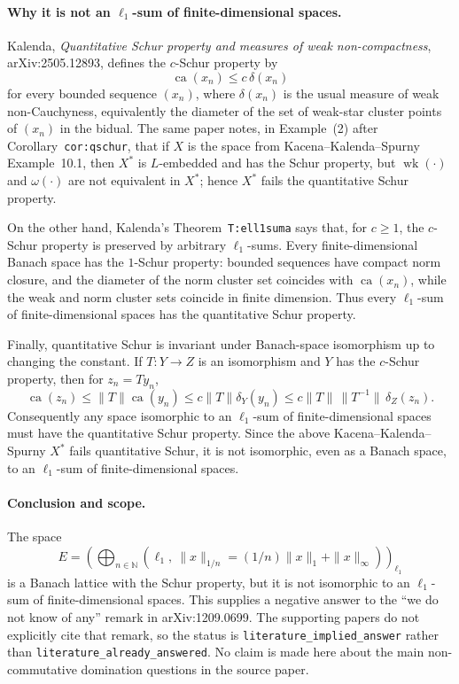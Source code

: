 \documentclass[11pt]{article}
\newcommand{\ca}{\operatorname{ca}}
\begin{document}
\paragraph{Why it is not an \(\ell_1\)-sum of finite-dimensional spaces.}
Kalenda, \emph{Quantitative Schur property and measures of weak
non-compactness}, arXiv:2505.12893, defines the \(c\)-Schur property by
\[
  \ca(x_n)\le c\,\delta(x_n)
\]
for every bounded sequence \((x_n)\), where \(\delta(x_n)\) is the usual
measure of weak non-Cauchyness, equivalently the diameter of the set of
weak-star cluster points of \((x_n)\) in the bidual.  The same paper notes, in
Example~(2) after Corollary~\texttt{cor:qschur}, that if \(X\) is the space
from Kacena--Kalenda--Spurny Example~10.1, then \(X^*\) is \(L\)-embedded and
has the Schur property, but \(\operatorname{wk}(\cdot)\) and
\(\omega(\cdot)\) are not equivalent in \(X^*\); hence \(X^*\) fails the
quantitative Schur property.

On the other hand, Kalenda's Theorem~\texttt{T:ell1suma} says that, for
\(c\ge 1\), the \(c\)-Schur property is preserved by arbitrary \(\ell_1\)-sums.
Every finite-dimensional Banach space has the \(1\)-Schur property: bounded
sequences have compact norm closure, and the diameter of the norm cluster set
coincides with \(\ca(x_n)\), while the weak and norm cluster sets coincide in
finite dimension.  Thus every \(\ell_1\)-sum of finite-dimensional spaces has
the quantitative Schur property.

Finally, quantitative Schur is invariant under Banach-space isomorphism up to
changing the constant.  If \(T:Y\to Z\) is an isomorphism and \(Y\) has the
\(c\)-Schur property, then for \(z_n=Ty_n\),
\[
  \ca(z_n)\le \|T\|\ca(y_n)
  \le c\|T\|\delta_Y(y_n)
  \le c\|T\|\,\|T^{-1}\|\,\delta_Z(z_n).
\]
Consequently any space isomorphic to an \(\ell_1\)-sum of finite-dimensional
spaces must have the quantitative Schur property.  Since the above
Kacena--Kalenda--Spurny \(X^*\) fails quantitative Schur, it is not
isomorphic, even as a Banach space, to an \(\ell_1\)-sum of finite-dimensional
spaces.

\paragraph{Conclusion and scope.}
The space
\[
  E=\left(\bigoplus_{n\in\mathbb N}
  (\ell_1,\ \|x\|_{1/n}=(1/n)\|x\|_1+\|x\|_\infty)\right)_{\ell_1}
\]
is a Banach lattice with the Schur property, but it is not isomorphic to an
\(\ell_1\)-sum of finite-dimensional spaces.  This supplies a negative answer
to the ``we do not know of any'' remark in arXiv:1209.0699.  The supporting
papers do not explicitly cite that remark, so the status is
\texttt{literature\_implied\_answer} rather than
\texttt{literature\_already\_answered}.  No claim is made here about the main
non-commutative domination questions in the source paper.
\end{document}
